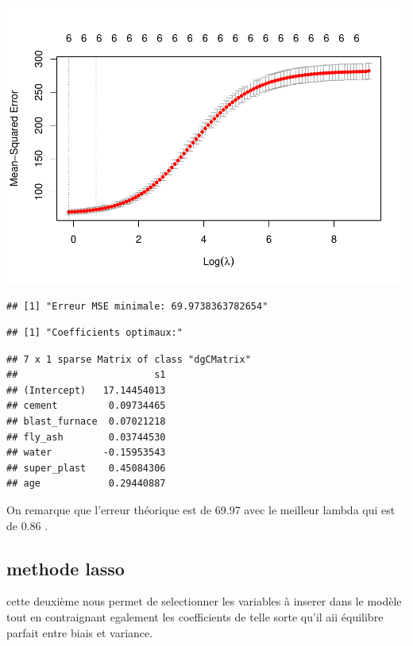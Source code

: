 \documentclass[
  12pt,
]{article}
\begin{document}
\includegraphics{rmd_final_files/figure-latex/unnamed-chunk-62-2.pdf}

\begin{verbatim}
## [1] "Erreur MSE minimale: 69.9738363782654"
\end{verbatim}

\begin{verbatim}
## [1] "Coefficients optimaux:"
\end{verbatim}

\begin{verbatim}
## 7 x 1 sparse Matrix of class "dgCMatrix"
##                        s1
## (Intercept)   17.14454013
## cement         0.09734465
## blast_furnace  0.07021218
## fly_ash        0.03744530
## water         -0.15953543
## super_plast    0.45084306
## age            0.29440887
\end{verbatim}

On remarque que l'erreur théorique est de 69.97 avec le meilleur lambda
qui est de 0.86 .

\subsection{methode lasso}\label{methode-lasso}

cette deuxième nous permet de selectionner les variables à inserer dans
le modèle tout en contraignant egalement les coefficients de telle sorte
qu'il aii équilibre parfait entre biais et variance.
\end{document}
